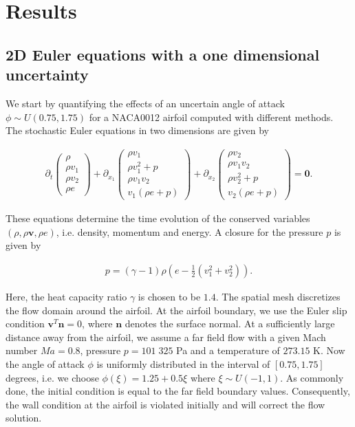 \section{Results}
\label{sec:results}

\subsection{2D Euler equations with a one dimensional uncertainty}
\label{sec:resultsNACA1D}
We start by quantifying the effects of an uncertain angle of attack $\phi\sim U(0.75,1.75)$ for a NACA0012 airfoil computed with different methods. The stochastic Euler equations in two dimensions are given by
\begin{linenomath*}\begin{align*}
\partial_t
\begin{pmatrix}
\rho \\ \rho v_1 \\ \rho v_2 \\ \rho e
\end{pmatrix}
+\partial_{x_1}
\begin{pmatrix}
\rho v_1 \\ \rho v_1^2 +p \\ \rho v_1 v_2 \\  v_1 (\rho e+p)
\end{pmatrix}
+\partial_{x_2}
\begin{pmatrix}
\rho v_2 \\ \rho v_1 v_2 \\ \rho v_2^2+p \\ v_2 (\rho e+p)
\end{pmatrix}
=\bm{0}.
\end{align*}\end{linenomath*}
These equations determine the time evolution of the conserved variables $(\rho,\rho \bm v, \rho e)$, i.e. density, momentum and energy. A closure for the pressure $p$ is given by
\begin{linenomath*}\begin{align*}
p = (\gamma-1)\rho\left(e-\frac12(v_1^2+v_2^2)\right).
\end{align*}\end{linenomath*}
Here, the heat capacity ratio $\gamma$ is chosen to be $1.4$. The spatial mesh discretizes the flow domain around the airfoil. At the airfoil boundary, we use the Euler slip condition $\bm v^T\bm n = 0$, where $\bm n$ denotes the surface normal. At a sufficiently large distance away from the airfoil, we assume a far field flow with a given Mach number $Ma = 0.8$, pressure $p = 101\;325$ Pa and a temperature of $273.15$ K. Now the angle of attack $\phi$ is uniformly distributed in the interval of $[0.75,1.75]$ degrees, i.e. we choose $\phi(\xi) = 1.25 + 0.5\xi$ where $\xi\sim U(-1,1)$. As commonly done, the initial condition is equal to the far field boundary values. Consequently, the wall condition at the airfoil is violated initially and will correct the flow solution. 

